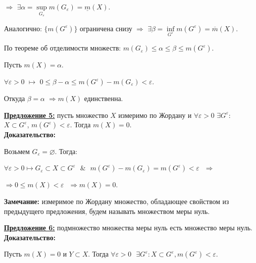 \documentclass[a4paper,12pt]{article} %
\begin{document}
$\Rightarrow$ $\exists \alpha = \sup\limits_{G_{\varepsilon}} m(G_{\varepsilon}) = \underline{m}(X)$.

Аналогично: $\{m(G^{\varepsilon})\}$ ограничена снизу $\Rightarrow$ $\exists \beta = \inf\limits_{G^{\varepsilon}} m(G^{\varepsilon}) = \overline{m}(X)$.

\vspace{3mm}

По теореме об отделимости множеств: $m(G_{\varepsilon}) \leqslant \alpha \leqslant \beta \leqslant m(G^{\varepsilon})$.

\vspace{3mm}
Пусть $m(X) = \alpha$.

$\forall \varepsilon > 0$ $\longmapsto$ $0 \leqslant \beta - \alpha \leqslant m(G^{\varepsilon}) - m(G_{\varepsilon}) < \varepsilon$.

Откуда $\beta = \alpha$ $\Rightarrow m(X)$ единственна. 


\vspace{3mm}

\underline{\textbf{Предложение 5:}} пусть множество $X$ измеримо по Жордану и $\forall \varepsilon > 0$ $\exists G^{\varepsilon}$: $X \subset G^{\varepsilon}$, $m(G^{\varepsilon}) < \varepsilon$. Тогда $m(X) = 0$.\\

\textbf{Доказательство:} 

Возьмем $G_{\varepsilon} = \varnothing$. Тогда:

$\forall \varepsilon > 0 \longmapsto G_{\varepsilon} \subset X \subset G^{\varepsilon} \text{ } \& \text{ } m(G^{\varepsilon}) - m(G_{\varepsilon}) = m(G^{\varepsilon}) < \varepsilon \text{ } \Rightarrow$ 

$\Rightarrow 0 \leqslant m(X) < \varepsilon \text{ } \Rightarrow m(X) = 0$.

\vspace{3mm}

\textbf{Замечание:} измеримое по Жордану множество, обладающее свойством из предыдущего предложения, будем называть множеством меры нуль.

\vspace{3mm}

\underline{\textbf{Предложение 6:}} подмножество множества меры нуль есть множество меры нуль.\\

\textbf{Доказательство:}
 
Пусть $m(X) = 0$ и $Y \subset X$. Тогда $\forall \varepsilon > 0 \text{ }\exists G^{\varepsilon}: X \subset G^{\varepsilon}, m(G^{\varepsilon}) < \varepsilon$.
\end{document}
